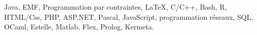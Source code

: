 
\noindent
Java, EMF, Programmation par contraintes, \LaTeX, C/C++, Bash, R, HTML/Css, PHP, ASP.NET, Pascal, JavaScript, programmation réseaux, SQL, OCaml, Estelle, Matlab, Flex, Prolog, Kermeta. \\
